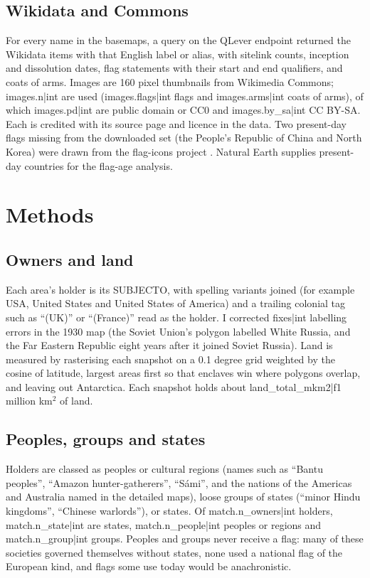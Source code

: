 \documentclass[11pt,a4paper]{article}
\begin{document}
\subsection{Wikidata and Commons}
For every name in the basemaps, a query on the QLever endpoint \citep{qlever} returned the Wikidata items with that English label or alias, with sitelink counts, inception and dissolution dates, flag statements with their start and end qualifiers, and coats of arms. Images are 160 pixel thumbnails from Wikimedia Commons; {{images.n|int}} are used ({{images.flags|int}} flags and {{images.arms|int}} coats of arms), of which {{images.pd|int}} are public domain or CC0 and {{images.by_sa|int}} CC BY-SA. Each is credited with its source page and licence in the data. Two present-day flags missing from the downloaded set (the People's Republic of China and North Korea) were drawn from the flag-icons project \citep{flagicons}. Natural Earth \citep{naturalearth} supplies present-day countries for the flag-age analysis.

\section{Methods}
\subsection{Owners and land}
Each area's holder is its SUBJECTO, with spelling variants joined (for example USA, United States and United States of America) and a trailing colonial tag such as ``(UK)'' or ``(France)'' read as the holder. I corrected {{fixes|int}} labelling errors in the 1930 map (the Soviet Union's polygon labelled White Russia, and the Far Eastern Republic eight years after it joined Soviet Russia). Land is measured by rasterising each snapshot on a 0.1 degree grid weighted by the cosine of latitude, largest areas first so that enclaves win where polygons overlap, and leaving out Antarctica. Each snapshot holds about {{land_total_mkm2|f1}} million km$^2$ of land.

\subsection{Peoples, groups and states}
Holders are classed as peoples or cultural regions (names such as ``Bantu peoples'', ``Amazon hunter-gatherers'', ``Sámi'', and the nations of the Americas and Australia named in the detailed maps), loose groups of states (``minor Hindu kingdoms'', ``Chinese warlords''), or states. Of {{match.n_owners|int}} holders, {{match.n_state|int}} are states, {{match.n_people|int}} peoples or regions and {{match.n_group|int}} groups. Peoples and groups never receive a flag: many of these societies governed themselves without states, none used a national flag of the European kind, and flags some use today would be anachronistic.
\end{document}

